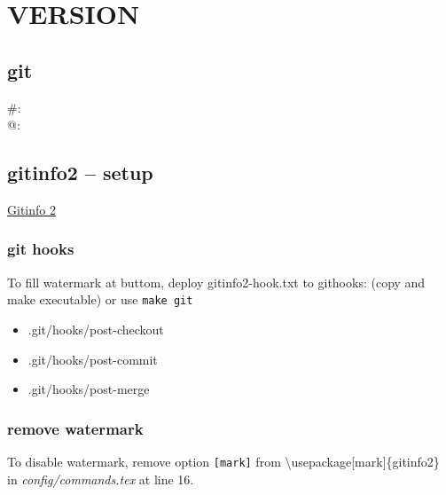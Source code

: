     \section{VERSION}
    \subsection{git}
    \#: \gitAbbrevHash\\
    @: \gitAuthorIsoDate\\
    \gitReferences
    \subsection{gitinfo2 -- setup}
    \href{https://www.ctan.org/tex-archive/macros/latex/contrib/gitinfo2}{Gitinfo 2}
    \subsubsection{git hooks}
    To fill watermark at buttom, deploy gitinfo2-hook.txt to githooks: (copy and make executable) or use \texttt{make git}
    \begin{itemize}
        \item .git/hooks/post-checkout
        \item .git/hooks/post-commit
        \item .git/hooks/post-merge
    \end{itemize}
    \subsubsection{remove watermark}
    To disable watermark, remove option \texttt{[mark]} from \textbackslash usepackage[mark]\{gitinfo2\} in \textit{config/commands.tex} at line 16.
